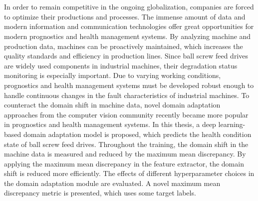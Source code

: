 \chapter{\abstractname}

In order to remain competitive in the ongoing globalization, companies are forced to optimize their productions and processes. The immense amount of data and modern information and communication technologies offer great opportunities for modern prognostics and health management systems. By analyzing machine and production data, machines can be proactively maintained, which increases the quality standards and efficiency in production lines. Since ball screw feed drives are widely used components in industrial machines, their degradation status monitoring is especially important. Due to varying working conditions, prognostics and health management systems must be developed robust enough to handle continuous changes in the fault characteristics of industrial machines. To counteract the domain shift in machine data, novel domain adaptation approaches from the computer vision community recently became more popular in prognostics and health management systems. In this thesis, a deep learning-based domain adaptation model is proposed, which predicts the health condition state of ball screw feed drives. Throughout the training, the domain shift in the machine data is measured and reduced by the maximum mean discrepancy. By applying the maximum mean discrepancy in the feature extractor, the domain shift is reduced more efficiently. The effects of different hyperparameter choices in the domain adaptation module are evaluated. A novel maximum mean discrepancy metric is presented, which uses some target labels. 


\makeatletter
{}
{\renewcommand{\abstractname}{Kurzfassung}}
{\renewcommand{\abstractname}{Abstract}}
\makeatother

\chapter{\abstractname}

